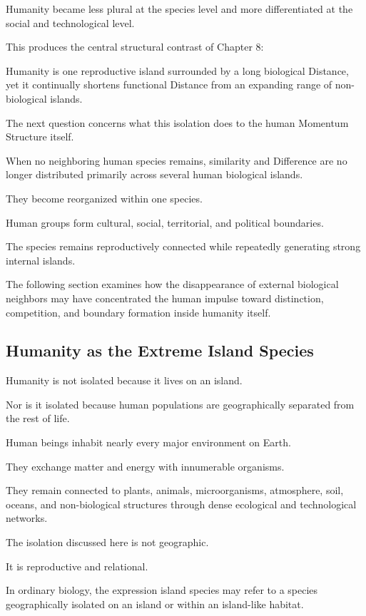 Humanity became less plural at the species level and more differentiated at the social and technological level.

This produces the central structural contrast of Chapter 8:

Humanity is one reproductive island surrounded by a long biological Distance, yet it continually shortens functional Distance from an expanding range of non-biological islands.

The next question concerns what this isolation does to the human Momentum Structure itself.

When no neighboring human species remains, similarity and Difference are no longer distributed primarily across several human biological islands.

They become reorganized within one species.

Human groups form cultural, social, territorial, and political boundaries.

The species remains reproductively connected while repeatedly generating strong internal islands.

The following section examines how the disappearance of external biological neighbors may have concentrated the human impulse toward distinction, competition, and boundary formation inside humanity itself.

\subsection*{\textbf{Humanity as the Extreme Island Species}}


Humanity is not isolated because it lives on an island.

Nor is it isolated because human populations are geographically separated from the rest of life.

Human beings inhabit nearly every major environment on Earth.

They exchange matter and energy with innumerable organisms.

They remain connected to plants, animals, microorganisms, atmosphere, soil, oceans, and non-biological structures through dense ecological and technological networks.

The isolation discussed here is not geographic.

It is reproductive and relational.

In ordinary biology, the expression island species may refer to a species geographically isolated on an island or within an island-like habitat.

